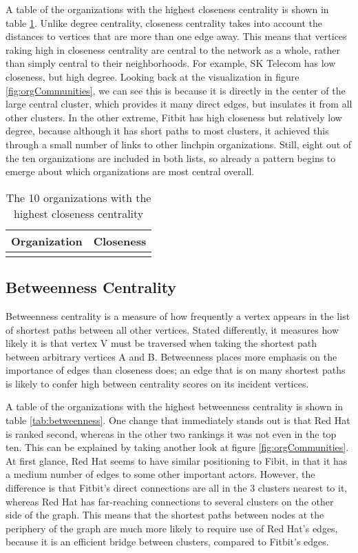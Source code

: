 A table of the organizations with the highest closeness centrality is shown in table \ref{tab:closeness}. Unlike degree centrality, closeness centrality takes into account the distances to vertices that are more than one edge away. This means that vertices raking high in closeness centrality are central to the network as a whole, rather than simply central to their neighborhoods. For example, SK Telecom has low closeness, but high degree. Looking back at the visualization in figure \ref{fig:orgCommunities}, we can see this is because it is directly in the center of the large central cluster, which provides it many direct edges, but insulates it from all other clusters. In the other extreme, Fitbit has high closeness but relatively low degree, because although it has short paths to most clusters, it achieved this through a small number of links to other linchpin organizations. Still, eight out of the ten organizations are included in both lists, so already a pattern begins to emerge about which organizations are most central overall.

\begin{table}
	\begin{tabular}{l|c}%
		\bfseries Organization & \bfseries Closeness%
		\csvreader[head to column names]{closeness.csv}{}%
		{\\\hline\organizationb & \scoreb}%
	\end{tabular}
	\centering
	\caption{The 10 organizations with the highest closeness centrality}\label{tab:closeness}
\end{table}

\subsection{Betweenness Centrality}
Betweenness centrality is a measure of how frequently a vertex appears in the list of shortest paths between all other vertices. Stated differently, it measures how likely it is that vertex V must be traversed when taking the shortest path between arbitrary vertices A and B. Betweenness places more emphasis on the importance of edges than closeness does; an edge that is on many shortest paths is likely to confer high between centrality scores on its incident vertices.

A table of the organizations with the highest betweenness centrality is shown in table \ref{tab:betweenness}. One change that immediately stands out is that Red Hat is ranked second, whereas in the other two rankings it was not even in the top ten. This can be explained by taking another look at figure \ref{fig:orgCommunities}. At first glance, Red Hat seems to have similar positioning to Fibit, in that it has a medium number of edges to some other important actors. However, the difference is that Fitbit's direct connections are all in the 3 clusters nearest to it, whereas Red Hat has far-reaching connections to several clusters on the other side of the graph. This means that the shortest paths between nodes at the periphery of the graph are much more likely to require use of Red Hat's edges, because it is an efficient bridge between clusters, compared to Fitbit's edges.


